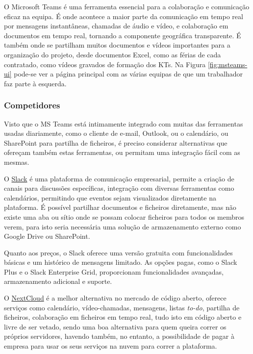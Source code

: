         O Microsoft Teams é uma ferramenta essencial para a colaboração e comunicação eficaz na equipa. É onde acontece a maior parte da comunicação em tempo real por mensagens instantâneas, chamadas de áudio e vídeo, e colaboração em documentos em tempo real, tornando a componente geográfica transparente. É também onde se partilham muitos documentos e vídeos importantes para a organização do projeto, desde documentos Excel, como as férias de cada contratado, como vídeos gravados de formação dos KTs. Na Figura \ref{fig:msteams-ui} pode-se ver a página principal com as várias equipas de que um trabalhador faz parte à esquerda.
            
        \subsubsection{Competidores}\label{competidores-msteams}

        Visto que o MS Teams está intimamente integrado com muitas das ferramentas usadas diariamente, como o cliente de e-mail, Outlook, ou o calendário, ou SharePoint para partilha de ficheiros, é preciso considerar alternativas que ofereçam também estas ferramentas, ou permitam uma integração fácil com as mesmas.

            \label{competidores-slack}

                O \href{https://slack.com/}{Slack} é uma plataforma de comunicação empresarial, permite a criação de canais para discussões específicas, integração com diversas ferramentas como calendários, permitindo que eventos sejam visualizados diretamente na plataforma. É possível partilhar documentos e ficheiros diretamente, mas não existe uma aba ou sítio onde se possam colocar ficheiros para todos os membros verem, para isto seria necessária uma solução de armazenamento externo como Google Drive ou SharePoint.
                
                Quanto aos preços, o Slack oferece uma versão gratuita com funcionalidades básicas e um histórico de mensagens limitado. As opções pagas, como o Slack Plus e o Slack Enterprise Grid, proporcionam funcionalidades avançadas, armazenamento adicional e suporte.

            \label{competidores-nextcloud}

                O \href{https://nextcloud.com/}{NextCloud} é a melhor alternativa no mercado de código aberto, oferece serviços como calendário, vídeo-chamadas, mensagens, listas \textit{to-do}, partilha de ficheiros, colaboração em ficheiros em tempo real, tudo isto em código aberto e livre de ser vetado, sendo uma boa alternativa para quem queira correr os próprios servidores, havendo também, no entanto, a possibilidade de pagar à empresa para usar os seus serviços na nuvem para correr a plataforma.

